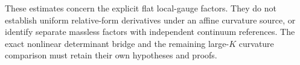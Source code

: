 These estimates concern the explicit flat local-gauge factors.
They do not establish uniform relative-form derivatives under an
affine curvature source, or identify separate massless factors
with independent continuum references.
The exact nonlinear determinant bridge and the remaining
large-\(K\) curvature comparison must retain their own
hypotheses and proofs.

